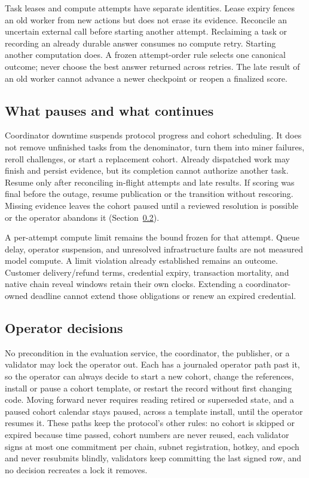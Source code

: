 Task leases and compute attempts have separate identities. Lease expiry fences
an old worker from new actions but does not erase its evidence. Reconcile an
uncertain external call before starting another attempt. Reclaiming a task or
recording an already durable answer consumes no compute retry. Starting another
computation does. A frozen attempt-order rule selects one canonical outcome;
never choose the best answer returned across retries. The late result of an
old worker cannot advance a newer checkpoint or reopen a finalized score.

\subsection{What pauses and what continues}\label{pause-behavior}

Coordinator downtime suspends protocol progress and cohort scheduling. It does
not remove unfinished tasks from the denominator, turn them into miner failures,
reroll challenges, or start a replacement cohort. Already dispatched work may
finish and persist evidence, but its completion cannot authorize another task.
Resume only after reconciling in-flight attempts and late results. If scoring
was final before the outage, resume publication or the transition without
rescoring. Missing evidence leaves the cohort paused until a reviewed resolution
is possible or the operator abandons it (Section~\ref{operator-decisions}).

A per-attempt compute limit remains the bound frozen for that attempt. Queue
delay, operator suspension, and unresolved infrastructure faults are not measured
model compute. A limit violation already established remains an outcome.
Customer delivery/refund terms, credential expiry, transaction mortality, and
native chain reveal windows retain their own clocks. Extending a
coordinator-owned deadline cannot extend those obligations or renew an expired credential.

\subsection{Operator decisions}\label{operator-decisions}

No precondition in the evaluation service, the coordinator, the publisher, or a
validator may lock the operator out. Each has a journaled operator path past
it, so the operator can always decide to start a new cohort, change the
references, install or pause a cohort template, or restart the record without
first changing code. Moving forward never requires reading retired or
superseded state, and a paused cohort calendar stays paused, across a template
install, until the operator resumes it. These paths keep the protocol's other
rules: no cohort is skipped or expired because time passed, cohort numbers are
never reused, each validator signs at most one commitment per chain, subnet
registration, hotkey, and epoch and never resubmits blindly, validators keep
committing the last signed row, and no decision recreates a lock it removes.

